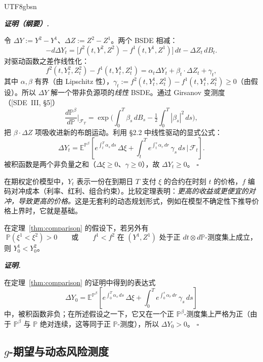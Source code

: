 \documentclass{article}
\newenvironment{proof}[1][证明]{%
  \par\smallskip\noindent\textit{\textbf{#1.}}\quad\ignorespaces
}{%
  \hfill$\square$\par\smallskip
}
\theoremstyle{plain}
\theoremstyle{definition}
\theoremstyle{remark}
\newcommand{\E}{\mathbb{E}}
\newcommand{\Prob}{\mathbb{P}}
\newcommand{\F}{\mathcal{F}}
\begin{document}
\begin{CJK*}{UTF8}{gbsn}
\begin{proof}[证明（纲要）]
令 $\Delta Y := Y^2 - Y^1$、$\Delta Z := Z^2 - Z^1$。两个 BSDE 相减：
\[
  -d\Delta Y_t = \big[f^2(t, Y^2, Z^2) - f^1(t, Y^1, Z^1)\big]\,dt - \Delta Z_t\, dB_t.
\]
对驱动函数之差作线性化：
\[
  f^2(t, Y^2_t, Z^2_t) - f^1(t, Y^1_t, Z^1_t) = \alpha_t \Delta Y_t + \beta_t \cdot \Delta Z_t + \gamma_t,
\]
其中 $\alpha, \beta$ 有界（由 Lipschitz 性），$\gamma_t := f^2(t, Y^1_t, Z^1_t) - f^1(t, Y^1_t, Z^1_t) \ge 0$（由假设）。所以 $\Delta Y$ 解一个带非负源项的\emph{线性} BSDE。通过 Girsanov 变测度（[SDE~III, \S5]）
\[
  \frac{d\Prob^\beta}{d\Prob}\bigg|_{\F_T} = \exp\!\Big(\int_0^T \beta_s\, dB_s - \tfrac12\!\int_0^T |\beta_s|^2\, ds\Big),
\]
把 $\beta \cdot \Delta Z$ 项吸收进新的布朗运动。利用 \S2.2 中线性驱动的显式公式：
\[
  \Delta Y_t = \E^{\Prob^\beta}\!\left[ e^{\int_t^T \alpha_s\, ds}\, \Delta \xi + \int_t^T e^{\int_t^s \alpha_r\, dr}\, \gamma_s\, ds \,\bigg|\, \F_t \right].
\]
被积函数是两个非负量之和（$\Delta \xi \ge 0$、$\gamma \ge 0$），故 $\Delta Y_t \ge 0$。
\end{proof}

\begin{remark}[金融解释]
在期权定价模型中，$Y_t$ 表示一份在到期日 $T$ 支付 $\xi$ 的合约在时刻 $t$ 的价格，$f$ 编码对冲成本（利率、红利、组合约束）。比较定理表明：\emph{更高的收益或更便宜的对冲，导致更高的价格。}这是无套利的动态规划形式，例如在模型不确定性下推导价格上界时，它就是基础。
\end{remark}

\begin{corollary}[严格比较]\label{cor:strict-comp}
在定理~\ref{thm:comparison} 的假设下，若另外有
\[
  \Prob(\xi^1 < \xi^2) > 0 \qquad\text{或}\qquad f^1 < f^2 \text{ 在 } (Y^1, Z^1) \text{ 处于正 } dt\otimes d\Prob\text{-测度集上成立，}
\]
则 $Y^1_0 < Y^2_0$。
\end{corollary}

\begin{proof}
在定理~\ref{thm:comparison} 的证明中得到的表达式
\[
  \Delta Y_0 = \E^{\Prob^\beta}\!\left[ e^{\int_0^T \alpha_s\, ds}\, \Delta \xi + \int_0^T e^{\int_0^s \alpha_r\, dr}\, \gamma_s\, ds \right]
\]
中，被积函数非负；在所述假设之一下，它又在一个正 $\Prob^\beta$-测度集上严格为正（由于 $\Prob^\beta$ 与 $\Prob$ 绝对连续，这等同于正 $\Prob$-测度），所以 $\Delta Y_0 > 0$。
\end{proof}

\subsection{\texorpdfstring{$g$}{g}-期望与动态风险测度}


\end{CJK*}
\end{document}
